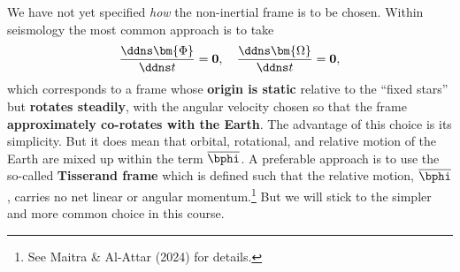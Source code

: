 We have not yet specified \emph{how} the non-inertial frame is to be chosen. Within seismology the most common 
approach is to take
\begin{equation}
\frac{\ddns \bm{\Phi}}{\ddns t}=\mathbf{0},\quad \frac{\ddns \bm{\Omega}}{\ddns t}=\mathbf{0},
\label{eq:35}
\end{equation}
which corresponds to a frame whose \textbf{origin is static} relative to the ``fixed stars'' but \textbf{rotates steadily}, 
with the angular velocity chosen so that the frame \textbf{approximately co-rotates with the Earth}. The advantage of this 
choice is its simplicity. But it does mean that orbital, rotational, and relative motion of the Earth are mixed 
up within the term $\overline{\bphi}$. A preferable approach is to use the so-called 
\textbf{Tisserand frame} which is defined such that the relative motion, $\overline{\bphi}$, carries no net linear
 or angular momentum.\footnote{See Maitra \& Al-Attar (2024) for details.}
But we will stick to the simpler and more common choice in this course. 

